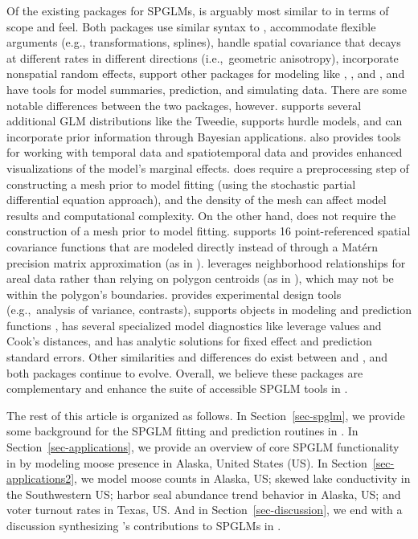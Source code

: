 \documentclass[
]{jss}
\begin{document}
Of the existing  packages for SPGLMs,  is
arguably most similar to  in terms of scope and feel. Both
packages use similar syntax to , accommodate flexible
 arguments (e.g., transformations, splines), handle
spatial covariance that decays at different rates in different
directions (i.e.,~geometric anisotropy), incorporate nonspatial random
effects, support other  packages for modeling like
 \citep{robinson2021broom, kuhn2022tidy}, 
\citep{lenth2024emmeans}, and  \citep{fox2019car}, and have
tools for model summaries, prediction, and simulating data. There are
some notable differences between the two packages, however. 
supports several additional GLM distributions like the Tweedie, supports
hurdle models, and can incorporate prior information through Bayesian
applications.  also provides tools for working with temporal
data and spatiotemporal data and provides enhanced visualizations of the
model's marginal effects.  does require a preprocessing step
of constructing a mesh prior to model fitting (using the stochastic
partial differential equation approach), and the density of the mesh can
affect model results and computational complexity. On the other hand,
 does not require the construction of a mesh prior to model
fitting.  supports 16 point-referenced spatial covariance
functions that are modeled directly instead of through a Matérn
precision matrix approximation (as in ). 
leverages neighborhood relationships for areal data rather than relying
on polygon centroids (as in ), which may not be within the
polygon's boundaries.  provides experimental design tools
(e.g.,~analysis of variance, contrasts), supports  objects in
modeling and prediction functions \citep{pebesma2018sf}, has several
specialized model diagnostics like leverage values and Cook's distances,
and has analytic solutions for fixed effect and prediction standard
errors. Other similarities and differences do exist between 
and , and both packages continue to evolve. Overall, we
believe these packages are complementary and enhance the suite of
accessible SPGLM tools in .

The rest of this article is organized as follows. In
Section~\ref{sec-spglm}, we provide some background for the SPGLM
fitting and prediction routines in . In
Section~\ref{sec-applications}, we provide an overview of core SPGLM
functionality in  by modeling moose presence in Alaska,
United States (US). In Section~\ref{sec-applications2}, we model moose
counts in Alaska, US; skewed lake conductivity in the Southwestern US;
harbor seal abundance trend behavior in Alaska, US; and voter turnout
rates in Texas, US. And in Section~\ref{sec-discussion}, we end with a
discussion synthesizing 's contributions to SPGLMs in
.
\end{document}
